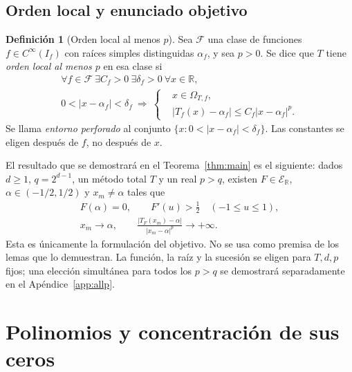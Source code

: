\documentclass[11pt,a4paper]{article}
\numberwithin{equation}{section}
\theoremstyle{definition}
\newtheorem{definition}[theorem]{Definición}
\theoremstyle{remark}
\newcommand{\R}{\mathbb R}
\newcommand{\ER}{\mathcal E_{\R}}
\begin{document}
\subsection{Orden local y enunciado objetivo}
\begin{definition}[Orden local al menos $p$]\label{def:order}
Sea $\mathcal F$ una clase de funciones $f\in C^\infty(I_f)$ con raíces simples distinguidas $\alpha_f$, y sea $p>0$. Se dice que $T$ tiene \emph{orden local al menos $p$} en esa clase si
\begin{equation}\label{eq:local}
\begin{gathered}
\forall f\in\mathcal F\ \exists C_f>0\ \exists\delta_f>0\ \forall x\in\R,\\
0<|x-\alpha_f|<\delta_f\ \Longrightarrow\
\left\{\begin{aligned}
&x\in\Omega_{T,f},\\
&|T_f(x)-\alpha_f|\le C_f|x-\alpha_f|^p.
\end{aligned}\right.
\end{gathered}
\end{equation}
Se llama \emph{entorno perforado} al conjunto $\{x:0<|x-\alpha_f|<\delta_f\}$. Las constantes se eligen después de $f$, no después de $x$.
\end{definition}

El resultado que se demostrará en el Teorema~\ref{thm:main} es el siguiente: dados $d\ge1$, $q=2^{d-1}$, un método total $T$ y un real $p>q$, existen $F\in\ER$, $\alpha\in(-1/2,1/2)$ y $x_m\ne\alpha$ tales que
\begin{equation}\label{eq:objective}
\begin{gathered}
F(\alpha)=0,\qquad F'(u)>\tfrac12\quad(-1\le u\le1),\\
x_m\to\alpha,\qquad
\frac{|T_F(x_m)-\alpha|}{|x_m-\alpha|^p}\longrightarrow+\infty.
\end{gathered}
\end{equation}
Esta es únicamente la formulación del objetivo. No se usa como premisa de los lemas que lo demuestran. La función, la raíz y la sucesión se eligen para $T,d,p$ fijos; una elección simultánea para todos los $p>q$ se demostrará separadamente en el Apéndice~\ref{app:allp}.

\clearpage
\section{Polinomios y concentración de sus ceros}\label{sec:polys}
\end{document}
